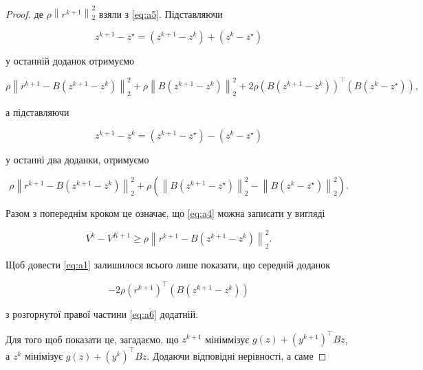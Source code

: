 \begin{proof}
    де $\rho \left\| r^{k + 1} \right\|_2^2$ взяли з \eqref{eq:a5}. Підставляючи

    \begin{equation*}
        z^{k + 1} - z^\star = \left( z^{k + 1} - z^k \right) + \left( z^k - z^\star \right)
    \end{equation*}

    у останній доданок отримуємо

    \begin{equation*}
        \rho \left\| r^{k + 1} - B \left( z^{k + 1} - z^k \right) \right\|_2^2 + \rho \left\| B \left( z^{k + 1} - z^k \right) \right\|_2^2 + 2 \rho \left( B \left( z^{k + 1} - z^k \right) \right)^\intercal \left( B \left( z^k - z^\star \right) \right),
    \end{equation*}

    а підставляючи

    \begin{equation*}
        z^{k + 1} - z^k = \left( z^{k + 1} - z^\star \right) - \left( z^k - z^\star \right)
    \end{equation*}

    у останні два доданки, отримуємо

    \begin{equation*}
        \rho \left\| r^{k + 1} - B \left( z^{k + 1} - z^k \right) \right\|_2^2 + \rho \left( \left\| B \left( z^{k + 1} - z^\star \right) \right\|_2^2 - \left\| B \left( z^k - z^\star \right) \right\|_2^2 \right).
    \end{equation*}

    Разом з попереднім кроком це означає, що \eqref{eq:a4} можна записати у вигляді

    \begin{equation}
        \label{eq:a6}
        V^k - V^{K + 1} \ge \rho \left\| r^{k + 1} - B \left( z^{k + 1} - z^k \right) \right\|_2^2.
    \end{equation}

    Щоб довести \eqref{eq:a1} залишилося всього лише показати, що середній доданок 
    
    \begin{equation*}
        - 2 \rho \left(r^{k + 1} \right)^\intercal \left( B \left( z^{k + 1} - z^k \right) \right)
    \end{equation*}
    
    з розгорнутої правої частини \eqref{eq:a6} додатній. \medskip

    Для того щоб показати це, загадаємо, що $z^{k + 1}$ мініммізує $g(z) + \left( y^{k + 1} \right)^\intercal B z$, а $z^k$ мінімізує $g(z) + \left( y^k \right)^\intercal B z$. Додаючи відповідні нерівності, а саме


\end{proof}
